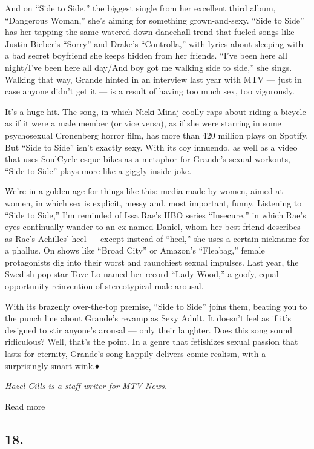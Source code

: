 And on ``Side to Side,'' the biggest single from her excellent third
album, ``Dangerous Woman,'' she's aiming for something grown-and-sexy.
``Side to Side'' has her tapping the same watered-down dancehall trend
that fueled songs like Justin Bieber's ``Sorry'' and Drake's
``Controlla,'' with lyrics about sleeping with a bad secret boyfriend
she keeps hidden from her friends. ``I've been here all night/I've been
here all day/And boy got me walking side to side,'' she sings. Walking
that way, Grande hinted in an interview last year with MTV --- just in
case anyone didn't get it --- is a result of having too much sex, too
vigorously.

It's a huge hit. The song, in which Nicki Minaj coolly raps about riding
a bicycle as if it were a male member (or vice versa), as if she were
starring in some psychosexual Cronenberg horror film, has more than 420
million plays on Spotify. But ``Side to Side'' isn't exactly sexy. With
its coy innuendo, as well as a video that uses SoulCycle-esque bikes as
a metaphor for Grande's sexual workouts, ``Side to Side'' plays more
like a giggly inside joke.

We're in a golden age for things like this: media made by women, aimed
at women, in which sex is explicit, messy and, most important, funny.
Listening to ``Side to Side,'' I'm reminded of Issa Rae's HBO series
``Insecure,'' in which Rae's eyes continually wander to an ex named
Daniel, whom her best friend describes as Rae's Achilles' heel ---
except instead of ``heel,'' she uses a certain nickname for a phallus.
On shows like ``Broad City'' or Amazon's ``Fleabag,'' female
protagonists dig into their worst and raunchiest sexual impulses. Last
year, the Swedish pop star Tove Lo named her record ``Lady Wood,'' a
goofy, equal-opportunity reinvention of stereotypical male arousal.

With its brazenly over-the-top premise, ``Side to Side'' joins them,
beating you to the punch line about Grande's revamp as Sexy Adult. It
doesn't feel as if it's designed to stir anyone's arousal --- only their
laughter. Does this song sound ridiculous? Well, that's the point. In a
genre that fetishizes sexual passion that lasts for eternity, Grande's
song happily delivers comic realism, with a surprisingly smart wink.♦

\emph{Hazel Cills is a staff writer for MTV News.}

Read more

\hypertarget{18}{%
\subsection{18.}\label{18}}

